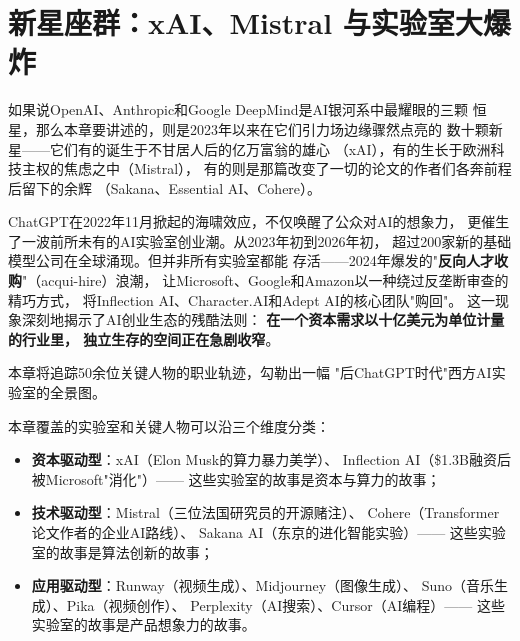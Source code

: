 
\chapter{新星座群：xAI、Mistral 与实验室大爆炸}
\label{ch:western-labs}

如果说OpenAI、Anthropic和Google DeepMind是AI银河系中最耀眼的三颗
恒星，那么本章要讲述的，则是2023年以来在它们引力场边缘骤然点亮的
数十颗新星——它们有的诞生于不甘居人后的亿万富翁的雄心
（xAI），有的生长于欧洲科技主权的焦虑之中（Mistral），
有的则是那篇改变了一切的论文的作者们各奔前程后留下的余辉
（Sakana、Essential AI、Cohere）。

ChatGPT在2022年11月掀起的海啸效应，不仅唤醒了公众对AI的想象力，
更催生了一波前所未有的AI实验室创业潮。从2023年初到2026年初，
超过200家新的基础模型公司在全球涌现。但并非所有实验室都能
存活——2024年爆发的"\textbf{反向人才收购}"（acqui-hire）浪潮，
让Microsoft、Google和Amazon以一种绕过反垄断审查的精巧方式，
将Inflection AI、Character.AI和Adept AI的核心团队"购回"。
这一现象深刻地揭示了AI创业生态的残酷法则：
\textbf{在一个资本需求以十亿美元为单位计量的行业里，
独立生存的空间正在急剧收窄}。

本章将追踪50余位关键人物的职业轨迹，勾勒出一幅
"后ChatGPT时代"西方AI实验室的全景图。

\begin{corebox}[本章人物地图]
本章覆盖的实验室和关键人物可以沿三个维度分类：
\begin{itemize}
  \item \textbf{资本驱动型}：xAI（Elon Musk的算力暴力美学）、
    Inflection AI（\$1.3B融资后被Microsoft"消化"）——
    这些实验室的故事是资本与算力的故事；
  \item \textbf{技术驱动型}：Mistral（三位法国研究员的开源赌注）、
    Cohere（Transformer论文作者的企业AI路线）、
    Sakana AI（东京的进化智能实验）——
    这些实验室的故事是算法创新的故事；
  \item \textbf{应用驱动型}：Runway（视频生成）、Midjourney（图像生成）、
    Suno（音乐生成）、Pika（视频创作）、
    Perplexity（AI搜索）、Cursor（AI编程）——
    这些实验室的故事是产品想象力的故事。
\end{itemize}
\end{corebox}



